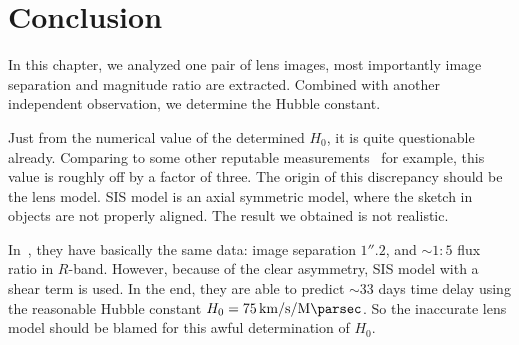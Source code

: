 \section{Conclusion}
In this chapter, we analyzed one pair of lens images, most importantly image separation and magnitude ratio are extracted. Combined with another independent observation, we determine the Hubble constant.

Just from the numerical value of the determined $H_0$, it is quite questionable already. Comparing to some other reputable measurements~\cite{Aghanim:2018eyx}\cite{Riess:2019cxk} for example, this value is roughly off by a factor of three. The origin of this discrepancy should be the lens model. SIS model is an axial symmetric model, where the sketch in~\cite{manual} objects are not properly aligned. The result we obtained is not realistic. 

In~\cite{Morgan:2003cf}, they have basically the same data: image separation $1''.2$, and $\sim 1:5$ flux ratio in $R$-band. However, because of the clear asymmetry, SIS model with a shear term is used. In the end, they are able to predict $\sim 33$ days time delay using the reasonable Hubble constant $H_0 = \SI{75}{\km\per\s\per\mega\parsec}$. So the inaccurate lens model should be blamed for this awful determination of $H_0$.
